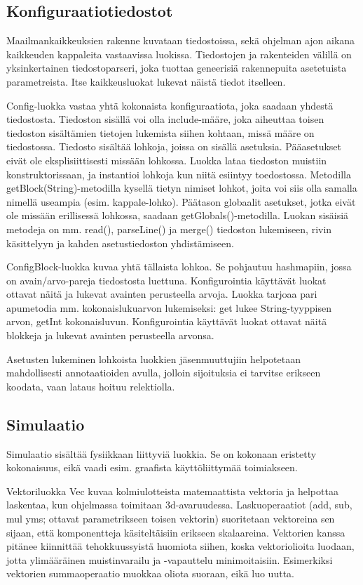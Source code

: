 \documentclass[a4paper,11pt]{article}
\begin{document}
\subsection{Konfiguraatiotiedostot}

Maailmankaikkeuksien rakenne kuvataan tiedostoissa, sekä ohjelman ajon aikana kaikkeuden kappaleita vastaavissa luokissa. Tiedostojen ja rakenteiden välillä on yksinkertainen tiedostoparseri, joka tuottaa geneerisiä rakennepuita asetetuista parametreista. Itse kaikkeusluokat lukevat näistä tiedot itselleen.

Config-luokka vastaa yhtä kokonaista konfiguraatiota, joka saadaan yhdestä tiedostosta. Tiedoston sisällä voi olla include-määre, joka aiheuttaa toisen tiedoston sisältämien tietojen lukemista siihen kohtaan, missä määre on tiedostossa. Tiedosto sisältää lohkoja, joissa on sisällä asetuksia. Pääasetukset eivät ole eksplisiittisesti missään lohkossa. Luokka lataa tiedoston muistiin konstruktorissaan, ja instantioi lohkoja kun niitä esiintyy toedostossa. Metodilla getBlock(String)-metodilla kysellä tietyn nimiset lohkot, joita voi siis olla samalla nimellä useampia (esim. kappale-lohko). Päätason globaalit asetukset, jotka eivät ole missään erillisessä lohkossa, saadaan getGlobals()-metodilla. Luokan sisäisiä metodeja on mm. read(), parseLine() ja merge() tiedoston lukemiseen, rivin käsittelyyn ja kahden asetustiedoston yhdistämiseen.

ConfigBlock-luokka kuvaa yhtä tällaista lohkoa. Se pohjautuu hashmapiin, jossa on avain/arvo-pareja tiedostosta luettuna. Konfigurointia käyttävät luokat ottavat näitä ja lukevat avainten perusteella arvoja. Luokka tarjoaa pari apumetodia mm. kokonaislukuarvon lukemiseksi: get lukee String-tyyppisen arvon, getInt kokonaisluvun. Konfigurointia käyttävät luokat ottavat näitä blokkeja ja lukevat avainten perusteella arvonsa.

Asetusten lukeminen lohkoista luokkien jäsenmuuttujiin helpotetaan mahdollisesti annotaatioiden avulla, jolloin sijoituksia ei tarvitse erikseen koodata, vaan lataus hoituu relektiolla.


\subsection{Simulaatio}

Simulaatio sisältää fysiikkaan liittyviä luokkia. Se on kokonaan eristetty kokonaisuus, eikä vaadi esim. graafista käyttöliittymää toimiakseen.

Vektoriluokka Vec kuvaa kolmiulotteista matemaattista vektoria ja helpottaa laskentaa, kun ohjelmassa toimitaan 3d-avaruudessa. Laskuoperaatiot (add, sub, mul yms; ottavat parametrikseen toisen vektorin) suoritetaan vektoreina sen sijaan, että komponentteja käsiteltäisiin erikseen skalaareina. Vektorien kanssa pitänee kiinnittää tehokkuussyistä huomiota siihen, koska vektoriolioita luodaan, jotta ylimääräinen muistinvarailu ja -vapauttelu minimoitaisiin. Esimerkiksi vektorien summaoperaatio muokkaa oliota suoraan, eikä luo uutta.
\end{document}
